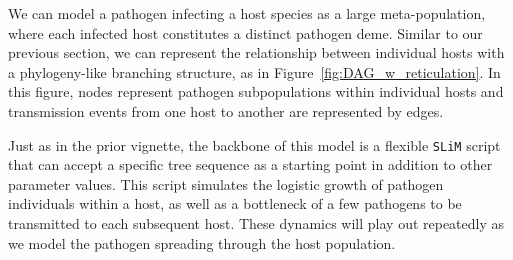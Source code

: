 \documentclass[12pt]{article}
\newcommand{\slim}[0]{\texttt{SLiM}\xspace}
\newcommand*{\ie}{i.e.\xcomma}
\begin{document}
We can model a pathogen infecting a host species as a large meta-population, where each infected host constitutes a distinct pathogen deme.
Similar to our previous section, we can represent the relationship between individual hosts with a phylogeny-like branching structure, as in Figure~\ref{fig:DAG_w_reticulation}.
In this figure, nodes represent pathogen subpopulations within individual hosts and transmission events from one host to another are represented by edges.

Just as in the prior vignette, the backbone of this model is a flexible \slim script that can accept a specific tree sequence as a starting point in addition to other
parameter values.
This script simulates the logistic growth of pathogen individuals within a host,
as well as a bottleneck of a few pathogens to be transmitted to each subsequent host.
These dynamics will play out repeatedly as we model the pathogen
spreading through the host population.
\end{document}
